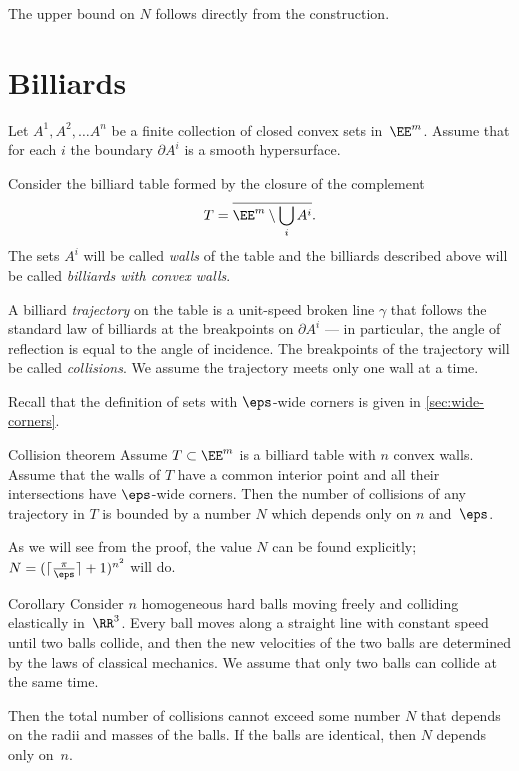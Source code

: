 The upper bound on $N$ follows directly from the construction.
\qeds



\section{Billiards}

Let $A^1,A^2,\dots A^n$ be a finite collection of closed convex sets in~$\EE^m$.
Assume that for each $i$
the boundary $\partial A^i$ is a smooth hypersurface.

Consider the billiard table formed by the closure of the complement 
$$T=\overline{\EE^m\setminus \bigcup_{i} A^i}.$$
The sets $A^i$ will be called {}\emph{walls} of the table
and the billiards described above will be called {}\emph{billiards with convex walls}.

A billiard {}\emph{trajectory} 
on the table is a unit-speed broken line $\gamma$ 
that  follows  the
standard law of billiards 
at the breakpoints on $\partial A^i$ 
--- in particular, the angle of reflection is equal to the angle of incidence.
The breakpoints of the trajectory will be called {}\emph{collisions}.
We assume the trajectory meets only one wall at a time.

Recall that the definition of sets with $\eps$-wide corners is given in \ref{sec:wide-corners}.

\begin{thm}{Collision theorem}\label{thm:collision}
Assume $T\subset\EE^m$ is a billiard table with $n$ convex walls.
Assume that the walls of $T$ have a common interior point  and all their intersections have $\eps$-wide corners.
Then the number of collisions of any trajectory in  $T$  is bounded
by a number $N$ which depends only on $n$ and~$\eps$.
\end{thm}

As we will see from the proof,
the value $N$ can be found explicitly;
$N=(\lceil\tfrac\pi\eps\rceil+1)^{n^2}$
will do.

\begin{thm}{Corollary}\label{cor:balls}
Consider $n$ homogeneous hard balls
moving freely and colliding
elastically in~$\RR^3$. 
Every ball moves
along a straight line with constant speed until two balls collide, and then
the new velocities of the two balls are determined by the
laws of classical mechanics. 
We assume that only two balls can collide at the same time.

Then the total number of collisions cannot exceed some number $N$ that  depends on the radii and masses of the balls.
If the balls are identical, then $N$ depends only on~$n$.
\end{thm}

